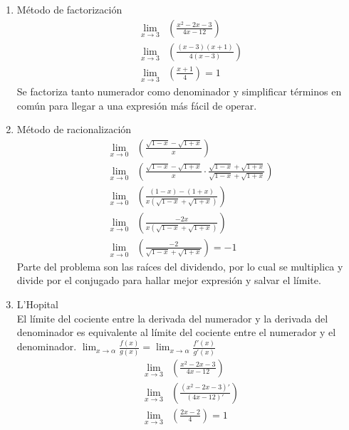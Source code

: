 \documentclass[12pt, a4paper]{article}
\begin{document}
\vspace{0.5cm}
\begin{enumerate}
\item Método de factorización
\begin{eqnarray}
&\lim_{x\to3}&\left(\frac{x^2-2x-3}{4x-12}\right)\\
&\lim_{x\to3}&\left(\frac{(x-3)(x+1)}{4\left(x-3\right)}\right)\\
&\lim_{x\to3}&\left(\frac{x+1}{4}\right) = 1
\end{eqnarray}
Se factoriza tanto numerador como denominador y simplificar términos en común para llegar a una expresión más fácil de operar.

\setcounter{equation}{0}
\vspace{1cm}

\item Método de racionalización
\begin{eqnarray}
    &\lim_{x\to0}&\left(\frac{\sqrt{1-x}-\sqrt{1+x}}{x}\right)\\
    &\lim_{x\to0}&\left(\frac{\sqrt{1-x}-\sqrt{1+x}}{x} \cdot \frac{\sqrt{1-x}+\sqrt{1+x}}{\sqrt{1-x}+\sqrt{1+x}}\right)\\
    &\lim_{x\to0}&\left(\frac{(1-x)-(1+x)}{x\left(\sqrt{1-x}+\sqrt{1+x}\right)}\right)\\
    &\lim_{x\to0}&\left(\frac{-2x}{x\left(\sqrt{1-x}+\sqrt{1+x}\right)}\right)\\
    &\lim_{x\to0}&\left(\frac{-2}{\sqrt{1-x}+\sqrt{1+x}}\right) = -1
\end{eqnarray}
Parte del problema son las raíces del dividendo, por lo cual se multiplica y divide por el conjugado para hallar mejor expresión y salvar el límite.

\setcounter{equation}{0}

\item L'Hopital\\[6pt]
El límite del cociente entre la derivada del numerador y la derivada del denominador es equivalente al límite del cociente entre el numerador y el denominador. $\displaystyle \lim_{x\to\alpha}\frac{f(x)}{g(x)}=\lim_{x\to\alpha}\frac{f'(x)}{g'(x)}$
\begin{eqnarray}
&\lim_{x\to3}&\left(\frac{x^2-2x-3}{4x-12}\right)\\
&\lim_{x\to3}&\left(\frac{\left(x^2-2x-3\right)'}{\left(4x-12\right)'}\right)\\
&\lim_{x\to3}&\left(\frac{2x-2}{4}\right) = 1
\end{eqnarray}
\end{enumerate}
\end{document}
